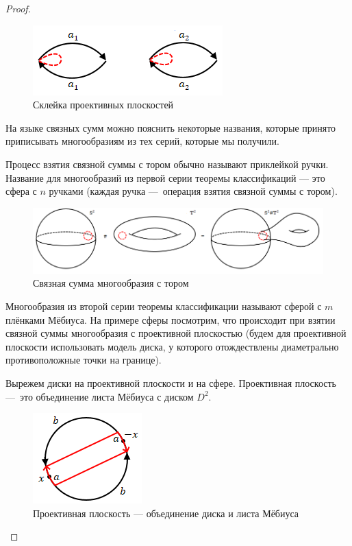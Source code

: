 \begin{proof}
    \begin{figure}[htbp]
        \centering
        \includegraphics[scale=0.7]{images/c11.6.png}
        \caption{Склейка проективных плоскостей}
        \label{fig:c11.6}
    \end{figure}

    На языке связных сумм можно пояснить некоторые названия, которые принято приписывать многообразиям из тех серий, которые мы получили.

    Процесс взятия связной суммы с тором обычно называют приклейкой ручки. Название для многообразий из первой серии теоремы классификаций — это сфера с $n$ ручками (каждая ручка — операция взятия связной суммы с тором).

    \begin{figure}[htbp]
        \centering
        \includegraphics[scale=0.5]{images/c11.7.png}
        \caption{Связная сумма многообразия с тором}
        \label{fig:c11.7}
    \end{figure}

    Многообразия из второй серии теоремы классификации называют сферой с $m$ плёнками Мёбиуса. На примере сферы посмотрим, что происходит при взятии связной суммы многообразия с проективной плоскостью (будем для проективной плоскости использовать модель диска, у которого отождествлены диаметрально противоположные точки на границе).

    Вырежем диски на проективной плоскости и на сфере. Проективная плоскость — это объединение листа Мёбиуса с диском $D^2$.

    \begin{figure}[htbp]
        \centering
        \includegraphics[scale=0.7]{images/c11.8.png}
        \caption{Проективная плоскость — объединение диска и листа Мёбиуса}
        \label{fig:c11.8}
    \end{figure}


\end{proof}
